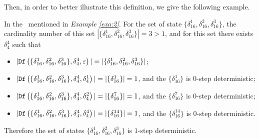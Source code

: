  Then, in order to better illustrate this definition, we give the following example.
\begin{example}
In the \BCN\ mentioned in {\em Example \ref{exa:2}}. For the set of state $\{\delta_{16}^1,\delta_{16}^2,\delta_{16}^3\}$, the cardinality number of this set $|\{\delta_{16}^1,\delta_{16}^2,\delta_{16}^3\}|=3>1$, and for this set there exists $\delta_{4}^4$ such that 
 \begin{itemize}
 \item  $|{\tt Df}\left(\{\delta_{16}^1,\delta_{16}^2,\delta_{16}^3\},\delta_{4}^4,\varepsilon\right)|=|\{\delta_{16}^1,\delta_{16}^2,\delta_{16}^3\}|$;
 \item  $|{\tt Df}\left(\{\delta_{16}^1,\delta_{16}^2,\delta_{16}^3\},\delta_{4}^4,\delta_{4}^1\right)|=|\{\delta_{16}^1\}|=1$, and the $\{\delta_{16}^1\}$ is $0$-step deterministic;
 \item  $|{\tt Df}\left(\{\delta_{16}^1,\delta_{16}^2,\delta_{16}^3\},\delta_{4}^4,\delta_{4}^2\right)|=|\{\delta_{16}^7\}|=1$, and the $\{\delta_{16}^7\}$ is $0$-step deterministic;
  \item  $|{\tt Df}\left(\{\delta_{16}^1,\delta_{16}^2,\delta_{16}^3\},\delta_{4}^4,\delta_{4}^4\right)|=|\{\delta_{16}^{14}\}|=1$, and the $\{\delta_{16}^{14}\}$ is $0$-step deterministic.
 \end{itemize}
 Therefore the set of states $\{\delta_{16}^1,\delta_{16}^2,\delta_{16}^3\}$ is $1$-step deterministic.
\label{exa:9}
\end{example}  

